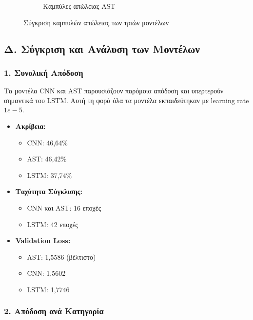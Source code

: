 \documentclass[a4paper,12pt]{article}
\begin{document}
\begin{figure}[H]
\begin{subfigure}[b]{0.32\textwidth}
        \caption{Καμπύλες απώλειας AST}
    \end{subfigure}
    \caption{Σύγκριση καμπυλών απώλειας των τριών μοντέλων}
\end{figure}

\subsection*{Δ. Σύγκριση και Ανάλυση των Μοντέλων}

\subsubsection*{1. Συνολική Απόδοση}

Τα μοντέλα CNN και AST παρουσιάζουν παρόμοια απόδοση και υπερτερούν σημαντικά του LSTM.
Αυτή τη φορά όλα τα μοντέλα εκπαιδεύτηκαν με learning rate $1e-5$.

\begin{itemize}
    \item \textbf{Ακρίβεια:} 
    \begin{itemize}
        \item CNN: 46,64\%
        \item AST: 46,42\%
        \item LSTM: 37,74\%
    \end{itemize}
    
    \item \textbf{Ταχύτητα Σύγκλισης:}
    \begin{itemize}
        \item CNN και AST: 16 εποχές
        \item LSTM: 42 εποχές
    \end{itemize}
    
    \item \textbf{Validation Loss:}
    \begin{itemize}
        \item AST: 1,5586 (βέλτιστο)
        \item CNN: 1,5602
        \item LSTM: 1,7746
    \end{itemize}
\end{itemize}

\subsubsection*{2. Απόδοση ανά Κατηγορία}
\end{document}
